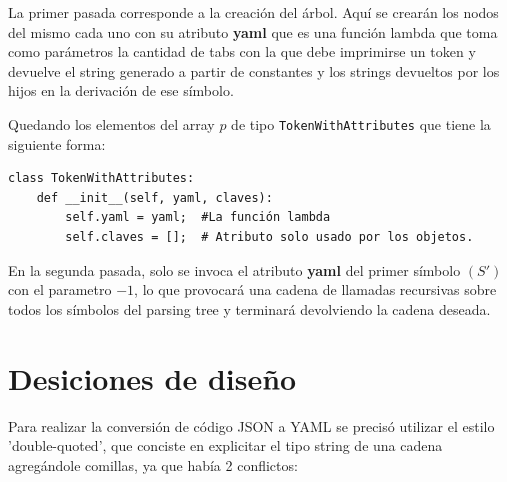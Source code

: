\documentclass{article}
\begin{document}
La primer pasada corresponde a la creación del árbol. Aquí se crearán los nodos del mismo cada uno con su atributo \textbf{yaml} que es una función lambda que toma como parámetros la cantidad de tabs con la que debe imprimirse un token y devuelve el string generado a partir de constantes y los strings devueltos por los hijos en la derivación de ese símbolo.

Quedando los elementos del array $p$ de tipo \texttt{TokenWithAttributes} que tiene la siguiente forma:

\begin{verbatim}
class TokenWithAttributes:
	def __init__(self, yaml, claves):
		self.yaml = yaml;  #La función lambda	
		self.claves = [];  # Atributo solo usado por los objetos.
\end{verbatim}

En la segunda pasada, solo se invoca el atributo \textbf{yaml} del primer símbolo $(S')$ con el parametro $-1$, lo que provocará una cadena de llamadas recursivas sobre todos los símbolos del parsing tree y terminará devolviendo la cadena deseada.
%
%

\section{Desiciones de diseño}
Para realizar la conversión de código JSON a YAML se precisó utilizar el estilo 'double-quoted', que conciste en explicitar el tipo string de una cadena agregándole comillas, ya que había 2 conflictos: 
\end{document}

